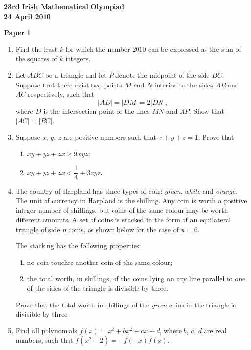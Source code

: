 \documentclass[12pt]{article}
\begin{document}
\begin{center}
{\large\bfseries 23rd Irish Mathematical Olympiad\\24 April 2010}
\end{center}
\bigskip\noindent\textbf{Paper 1}\bigskip
\begin{enumerate}
\item Find the least $k$ for which the number $2010$ can be expressed as the sum of the squares of $k$ integers.

\item Let $ABC$ be a triangle and let $P$ denote the midpoint of the side $BC$. Suppose that there exist two points $M$ and $N$ interior to the sides $AB$ and $AC$ respectively, such that
\[
|AD| = |DM| = 2|DN|,
\]
where $D$ is the intersection point of the lines $MN$ and $AP$. Show that $|AC| = |BC|$.

\item Suppose $x$, $y$, $z$ are positive numbers such that $x + y + z = 1$. Prove that

\begin{enumerate}
\item $xy + yz + zx \ge 9xyz$;

\item $xy + yz + zx < \dfrac{1}{4} + 3xyz$.
\end{enumerate}

\item The country of Harpland has three types of coin: \textit{green}, \textit{white} and \textit{orange}. The unit of currency in Harpland is the shilling. Any coin is worth a positive integer number of shillings, but coins of the same colour may be worth different amounts. A set of coins is stacked in the form of an equilateral triangle of side $n$ coins, as shown below for the case of $n = 6$.

The stacking has the following properties:
\begin{enumerate}
\item no coin touches another coin of the same colour;
\item the total worth, in shillings, of the coins lying on any line parallel to one of the sides of the triangle is divisible by three.
\end{enumerate}
Prove that the total worth in shillings of the \textit{green} coins in the triangle is divisible by three.

\item Find all polynomials $f(x) = x^3 + bx^2 + cx + d$, where $b$, $c$, $d$ are real numbers, such that $f(x^2 - 2) = -f(-x)f(x)$.
\end{enumerate}
\end{document}
